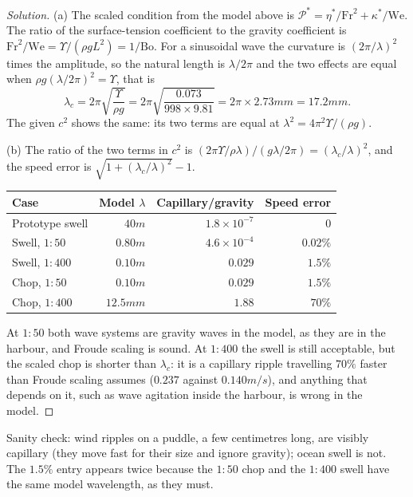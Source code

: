 \begin{proof}[Solution]
(a) The scaled condition from the model above is $\mathcal{P}^* = \eta^*/\mathrm{Fr}^2 + \kappa^*/\mathrm{We}$. The ratio of the surface-tension coefficient to the gravity coefficient is $\mathrm{Fr}^2/\mathrm{We} = \Upsilon/(\rho g L^2) = 1/\mathrm{Bo}$. For a sinusoidal wave the curvature is $(2\pi/\lambda)^2$ times the amplitude, so the natural length is $\lambda/2\pi$ and the two effects are equal when $\rho g(\lambda/2\pi)^2 = \Upsilon$, that is
\[
\lambda_c = 2\pi\sqrt{\frac{\Upsilon}{\rho g}} = 2\pi\sqrt{\frac{0.073}{998 \times 9.81}} = 2\pi \times 2.73\unit{mm} = 17.2\unit{mm}.
\]
The given $c^2$ shows the same: its two terms are equal at $\lambda^2 = 4\pi^2\Upsilon/(\rho g)$.

(b) The ratio of the two terms in $c^2$ is $(2\pi\Upsilon/\rho\lambda)/(g\lambda/2\pi) = (\lambda_c/\lambda)^2$, and the speed error is $\sqrt{1 + (\lambda_c/\lambda)^2} - 1$.

\begin{center}\small
\begin{tabular}{lrrr}
\toprule
Case & Model $\lambda$ & Capillary/gravity & Speed error \\
\midrule
Prototype swell & $40\unit{m}$ & $1.8\times10^{-7}$ & $0$ \\
Swell, $1{:}50$ & $0.80\unit{m}$ & $4.6\times10^{-4}$ & $0.02\%$ \\
Swell, $1{:}400$ & $0.10\unit{m}$ & $0.029$ & $1.5\%$ \\
Chop, $1{:}50$ & $0.10\unit{m}$ & $0.029$ & $1.5\%$ \\
Chop, $1{:}400$ & $12.5\unit{mm}$ & $1.88$ & $70\%$ \\
\bottomrule
\end{tabular}
\end{center}

At $1{:}50$ both wave systems are gravity waves in the model, as they are in the harbour, and Froude scaling is sound. At $1{:}400$ the swell is still acceptable, but the scaled chop is shorter than $\lambda_c$: it is a capillary ripple travelling $70\%$ faster than Froude scaling assumes ($0.237$ against $0.140\unit{m/s}$), and anything that depends on it, such as wave agitation inside the harbour, is wrong in the model.
\end{proof}

Sanity check: wind ripples on a puddle, a few centimetres long, are visibly capillary (they move fast for their size and ignore gravity); ocean swell is not. The $1.5\%$ entry appears twice because the $1{:}50$ chop and the $1{:}400$ swell have the same model wavelength, as they must.

